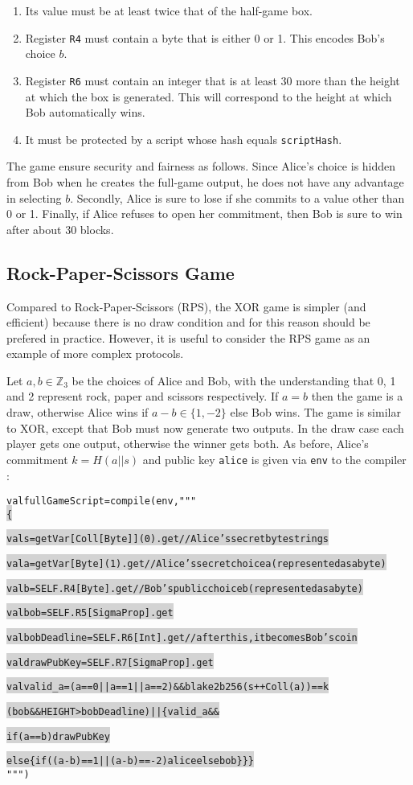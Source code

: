 \documentclass[11pt]{article}
\newcommand\Hi[2][lightgray]{%
	\hspace*{-\fboxsep}%
	\colorbox{#1}{#2}%
	\hspace*{-\fboxsep}%
}
\begin{document}
\begin{enumerate}
	\item Its value must be at least twice that of the half-game box.
	\item Register \texttt{R4} must contain a byte that is either 0 or 1. This encodes Bob's choice $b$.
	\item Register \texttt{R6} must contain an integer that is at least 30 more than the height at which the box is generated. This will correspond to the height at which Bob automatically wins.
	\item It must be protected by a script whose hash equals \texttt{scriptHash}.
\end{enumerate}
 
The game ensure security and fairness as follows. Since Alice's choice is hidden from Bob when he creates the full-game output, he does not have any advantage in selecting $b$. Secondly, Alice is sure to lose if she commits to a value other than 0 or 1. Finally, if Alice refuses to open her commitment, then Bob is sure to win after about 30 blocks. 
\subsection{Rock-Paper-Scissors Game}

Compared to Rock-Paper-Scissors (RPS), the XOR game is simpler (and efficient) because there is no draw condition and for this reason should be prefered in practice. However, it is useful to consider the RPS game as an example of more complex protocols.

Let $a, b\in \mathbb{Z}_3$ be the choices of Alice and Bob, with the understanding that 0, 1 and 2 represent rock, paper and scissors respectively. If $a = b$ then the game is a draw, otherwise Alice wins if $a-b \in \{1, -2\}$ else Bob wins. The game is similar to XOR, except that Bob must now generate two outputs. In the draw case each player gets one output, otherwise the winner gets both. 
As before, Alice's commitment $k=H(a||s)$ and public key \texttt{alice} is given via \texttt{env} to the compiler	:

\begin{alltt}
val fullGameScript = compile(env, """ \Hi{\{}
  \Hi{val s = getVar[Coll[Byte]](0).get  // Alice's secret byte string s}
  \Hi{val a = getVar[Byte](1).get  // Alice's secret choice a (represented as a byte)}
  \Hi{val b = SELF.R4[Byte].get    // Bob's public choice b (represented as a byte)}
  \Hi{val bob = SELF.R5[SigmaProp].get}
  \Hi{val bobDeadline = SELF.R6[Int].get // after this, it becomes Bob's coin}
  \Hi{val drawPubKey = SELF.R7[SigmaProp].get}
  \Hi{val valid_a = (a == 0 || a == 1 || a == 2) && blake2b256(s ++ Coll(a)) == k}

  \Hi{(bob && HEIGHT > bobDeadline) || \{ valid_a &&}
    \Hi{if (a == b) drawPubKey}
    \Hi{else \{ if ((a - b) == 1 || (a - b) == -2) alice else bob \}\}\}} """)
\end{alltt}
\end{document}
